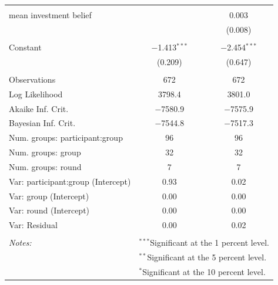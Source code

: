 \begin{table}[!htbp]
\begin{tabular}{@{\extracolsep{5pt}}lcc}
  & & \\ 
 mean investment belief &  & 0.003 \\ 
  &  & (0.008) \\ 
  & & \\ 
 Constant & $-$1.413$^{***}$ & $-$2.454$^{***}$ \\ 
  & (0.209) & (0.647) \\ 
  & & \\ 
  \hline
Observations & 672 & 672 \\ 
Log Likelihood & 3798.4 & 3801.0 \\ 
Akaike Inf. Crit. & $-$7580.9 & $-$7575.9 \\ 
Bayesian Inf. Crit. & $-$7544.8 & $-$7517.3 \\
\hline
Num. groups: participant:group     & 96     &   96   \\
Num. groups: group               & 32      &    32  \\
Num. groups: round                         & 7   & 7        \\
\hline
Var: participant:group (Intercept) & 0.93   & 0.02     \\
Var: group (Intercept)           & 0.00   & 0.00     \\
Var: round (Intercept)           & 0.00    & 0.00    \\
Var: Residual                    & 0.00     &  0.02  \\
\hline
\hline \\[-1.8ex] 
\textit{Notes:} & \multicolumn{2}{l}{$^{***}$Significant at the 1 percent level.} \\ 
 & \multicolumn{2}{l}{$^{**}$Significant at the 5 percent level.} \\ 
 & \multicolumn{2}{l}{$^{*}$Significant at the 10 percent level.} \\ 
\end{tabular} 
\end{table} 